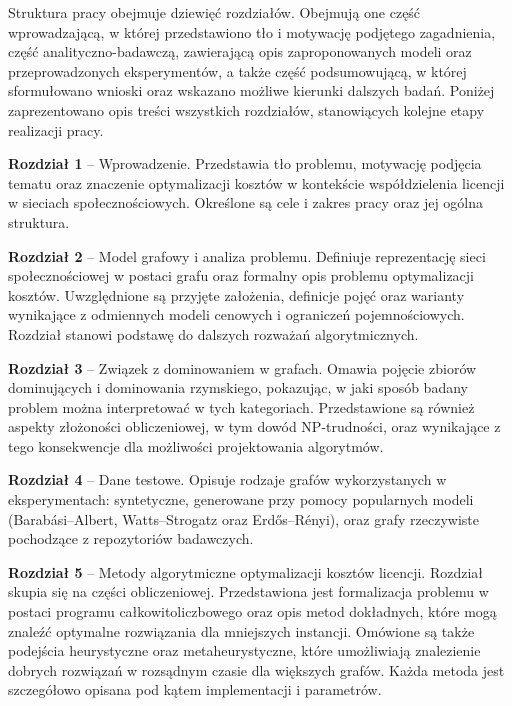 Struktura pracy obejmuje dziewięć rozdziałów. Obejmują one część wprowadzającą, w której przedstawiono tło i motywację podjętego zagadnienia, część analityczno-badawczą, zawierającą opis zaproponowanych modeli oraz przeprowadzonych eksperymentów, a także część podsumowującą, w której sformułowano wnioski oraz wskazano możliwe kierunki dalszych badań. Poniżej zaprezentowano opis treści wszystkich rozdziałów, stanowiących kolejne etapy realizacji pracy.

\begin{description}
  \item \textbf{Rozdział 1} -- Wprowadzenie. Przedstawia tło problemu, motywację podjęcia tematu oraz znaczenie optymalizacji kosztów w kontekście współdzielenia licencji w sieciach społecznościowych. Określone są cele i zakres pracy oraz jej ogólna struktura.

  \item \textbf{Rozdział 2} -- Model grafowy i analiza problemu. Definiuje reprezentację sieci społecznościowej w postaci grafu oraz formalny opis problemu optymalizacji kosztów. Uwzględnione są przyjęte założenia, definicje pojęć oraz warianty wynikające z odmiennych modeli cenowych i ograniczeń pojemnościowych. Rozdział stanowi podstawę do dalszych rozważań algorytmicznych.

  \item \textbf{Rozdział 3} -- Związek z dominowaniem w grafach. Omawia pojęcie zbiorów dominujących i dominowania rzymskiego, pokazując, w jaki sposób badany problem można interpretować w tych kategoriach. Przedstawione są również aspekty złożoności obliczeniowej, w tym dowód NP-trudności, oraz wynikające z tego konsekwencje dla możliwości projektowania algorytmów.

  \item \textbf{Rozdział 4} -- Dane testowe. Opisuje rodzaje grafów wykorzystanych w eksperymentach: syntetyczne, generowane przy pomocy popularnych modeli (Barabási--Albert, Watts--Strogatz oraz Erdős--Rényi), oraz grafy rzeczywiste pochodzące z repozytoriów badawczych.

  \item \textbf{Rozdział 5} -- Metody algorytmiczne optymalizacji kosztów licencji. Rozdział skupia się na części obliczeniowej. Przedstawiona jest formalizacja problemu w postaci programu całkowitoliczbowego oraz opis metod dokładnych, które mogą znaleźć optymalne rozwiązania dla mniejszych instancji. Omówione są także podejścia heurystyczne oraz metaheurystyczne, które umożliwiają znalezienie dobrych rozwiązań w rozsądnym czasie dla większych grafów. Każda metoda jest szczegółowo opisana pod kątem implementacji i parametrów.


\end{description}
